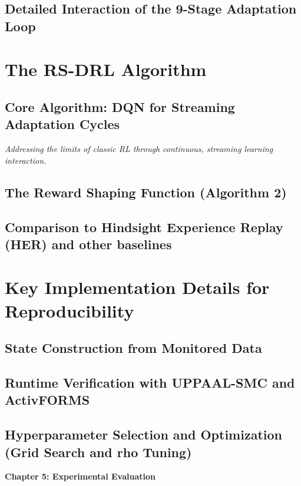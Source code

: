 \documentclass[11pt,a4paper]{article}
\begin{document}
\subsection{Detailed Interaction of the 9-Stage Adaptation Loop}

\section{The RS-DRL Algorithm}
\subsection{Core Algorithm: DQN for Streaming Adaptation Cycles}
\textit{Addressing the limits of classic RL through continuous, streaming learning interaction.}
\subsection{The Reward Shaping Function (Algorithm 2)}
\subsection{Comparison to Hindsight Experience Replay (HER) and other baselines}

\section{Key Implementation Details for Reproducibility}
\subsection{State Construction from Monitored Data}
\subsection{Runtime Verification with UPPAAL-SMC and ActivFORMS}
\subsection{Hyperparameter Selection and Optimization (Grid Search and rho Tuning)}

\newpage

\vspace*{1cm}
{\centering \huge \textbf{Chapter 5: Experimental Evaluation} \par}
\vspace{1cm}
\end{document}
